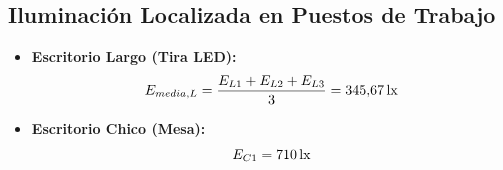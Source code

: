 \subsection{Iluminación Localizada en Puestos de Trabajo}
\begin{itemize}
    \item \textbf{Escritorio Largo (Tira LED):}
    \begin{equation}
        E_{media,L} = \frac{E_{L1} + E_{L2} + E_{L3}}{3} = 345{,}67 \,\mathrm{lx}
    \end{equation}
    \item \textbf{Escritorio Chico (Mesa):}
    \begin{equation}
        E_{C1} = 710 \,\mathrm{lx}
    \end{equation}
\end{itemize}
